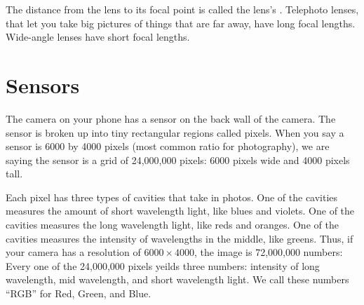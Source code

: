 The distance from the lens to its focal point is called the lens's
. Telephoto lenses, that let you take big
pictures of things that are far away, have long focal lengths.
Wide-angle lenses have short focal lengths.

\section{Sensors}

The camera on your phone has a sensor on the back wall of the
camera. The sensor is broken up into tiny rectangular regions called
pixels. When you say a sensor is 6000 by 4000 pixels (most common ratio for photography), we are saying
the sensor is a grid of 24,000,000 pixels: 6000 pixels wide and
4000 pixels tall.

Each pixel has three types of cavities that take in photos. One of the
cavities measures the amount of short wavelength light, like blues and
violets. One of the cavities measures the long wavelength light, like
reds and oranges. One of the cavities measures the intensity of
wavelengths in the middle, like greens.
Thus, if your camera has a resolution of $6000 \times 4000$, the image
is 72,000,000 numbers: Every one of the 24,000,000 pixels yeilds three
numbers: intensity of long wavelength, mid wavelength, and short
wavelength light. We call these numbers ``RGB'' for Red, Green, and
Blue.

